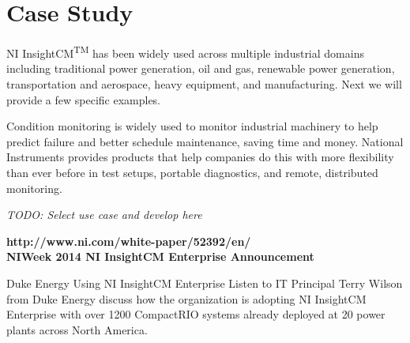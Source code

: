 \section{Case Study}

NI InsightCM\textsuperscript{TM} has been widely used across multiple industrial domains including traditional power generation, oil and gas, renewable power generation, transportation and aerospace, heavy equipment, and manufacturing. Next we will provide a few specific examples.

Condition monitoring is widely used to monitor industrial machinery to help predict failure and better schedule maintenance, saving time and money. National Instruments provides products that help companies do this with more flexibility than ever before in test setups, portable diagnostics, and remote, distributed monitoring. \cite{MCM_UC_NI}

\emph{TODO: Select use case and develop here}

\textbf{http://www.ni.com/white-paper/52392/en/
\\
NIWeek 2014 NI InsightCM Enterprise Announcement}

Duke Energy Using NI InsightCM Enterprise
Listen to IT Principal Terry Wilson from Duke Energy discuss how the organization is adopting NI InsightCM Enterprise with over 1200 CompactRIO systems already deployed at 20 power plants across North America.

